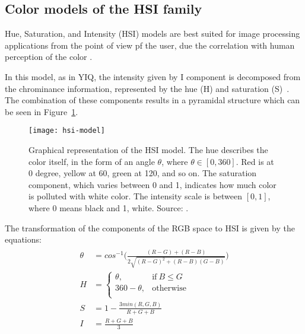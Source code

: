 \subsection{Color models of the HSI family}
\label{sec:modelo_cores_hsi}

Hue, Saturation, and Intensity (HSI) models are best suited for image processing applications from the point of view pf the user, due the correlation with human perception of the color \citep{konstantinos:00}.

In this model, as in YIQ, the intensity given by I component is decomposed from the chrominance information, represented by the hue (H) and saturation (S)~\citep{konstantinos:00}. The combination of these components results in a pyramidal structure which can be seen in Figure~\ref{fig:hsi-model}.

\begin{figure}[!ht]
  \centering
  \texttt{[image: hsi-model]}
  \caption[Graphical representation of the HSI model]{Graphical representation of the HSI model. The hue describes the color itself, in the form of an angle $\theta$, where $\theta \in [0, 360]$. Red is at 0 degree, yellow at 60, green at 120, and so on. The saturation component, which varies between 0 and 1, indicates how much color is polluted with white color. The intensity scale is between $[0, 1]$, where 0 means black and 1, white. Source: \citet{blackice:16}.}
  \label{fig:hsi-model} 
\end{figure}

The transformation of the components of the RGB space to HSI is given by the equations:
\begin{align}
\label{eq:rgb_para_hsi}
\begin{split}
  \theta &= cos^{-1} \bigg( \frac{(R - G) + (R - B)}{2 \sqrt{(R - G)^2 + (R - B)(G - B)}} \bigg)
  \\[0.5em]
  H &= \begin{cases}
            \theta,       & \text{if}\ B \leq G\\
            360 - \theta, & \text{otherwise}\\
       \end{cases}
  \\[0.5em]
  S &= 1 - \frac{3 min(R, G, B)}{R + G + B}
  \\[0.5em]
  I &= \frac{R + G + B}{3}
\end{split}
\end{align}

